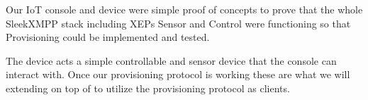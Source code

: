Our IoT console and device were simple proof of concepts to prove that the whole
SleekXMPP stack including XEPs Sensor and Control were functioning so that
Provisioning could be implemented and tested.

The device acts a simple controllable and sensor device that the console can
interact with. Once our provisioning protocol is working these are what we will
extending on top of to utilize the provisioning protocol as clients.
